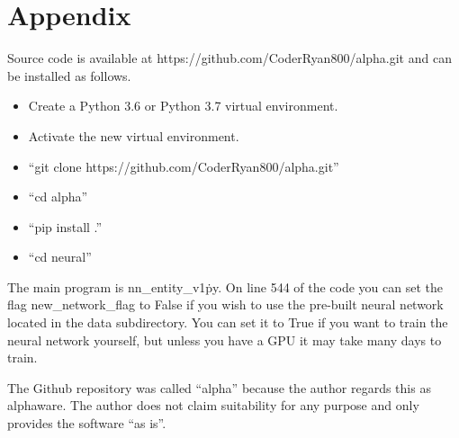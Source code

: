 \documentclass{article}
\begin{document}
\section{Appendix}

Source code is available at https://github.com/CoderRyan800/alpha.git and
can be installed as follows.

\begin{itemize}
\item Create a Python 3.6 or Python 3.7 virtual environment.
\item Activate the new virtual environment.
\item ``git clone https://github.com/CoderRyan800/alpha.git''
\item ``cd alpha''
\item ``pip install .''
\item ``cd neural''
\end{itemize}

The main program is nn\_entity\_v1\.py.  On line 544 of the code you can
set the flag new\_network\_flag to False if you wish to use the pre-built
neural network located in the data subdirectory.  You can set it to True
if you want to train the neural network yourself, but unless you have a GPU
it may take many days to train.

The Github repository was called ``alpha'' because the author regards this
as alphaware.  The author does not claim suitability for any purpose and
only provides the software ``as is''.




\end{document}

